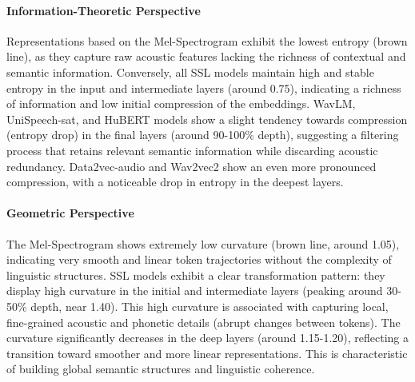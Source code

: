 \documentclass[5p]{elsarticle}
\begin{document}
\paragraph{Information-Theoretic Perspective} Representations based on the Mel-Spectrogram exhibit the lowest entropy (brown line), as they capture raw acoustic features lacking the richness of contextual and semantic information. Conversely, all SSL models maintain high and stable entropy in the input and intermediate layers (around 0.75), indicating a richness of information and low initial compression of the embeddings. WavLM, UniSpeech-sat, and HuBERT models show a slight tendency towards compression (entropy drop) in the final layers (around 90-100\% depth), suggesting a filtering process that retains relevant semantic information while discarding acoustic redundancy. Data2vec-audio and Wav2vec2 show an even more pronounced compression, with a noticeable drop in entropy in the deepest layers.



\paragraph{Geometric Perspective} The Mel-Spectrogram shows extremely low curvature (brown line, around 1.05), indicating very smooth and linear token trajectories without the complexity of linguistic structures. SSL models exhibit a clear transformation pattern: they display high curvature in the initial and intermediate layers (peaking around 30-50\% depth, near 1.40). This high curvature is associated with capturing local, fine-grained acoustic and phonetic details (abrupt changes between tokens). The curvature significantly decreases in the deep layers (around 1.15-1.20), reflecting a transition toward smoother and more linear representations. This is characteristic of building global semantic structures and linguistic coherence. 
\end{document}
